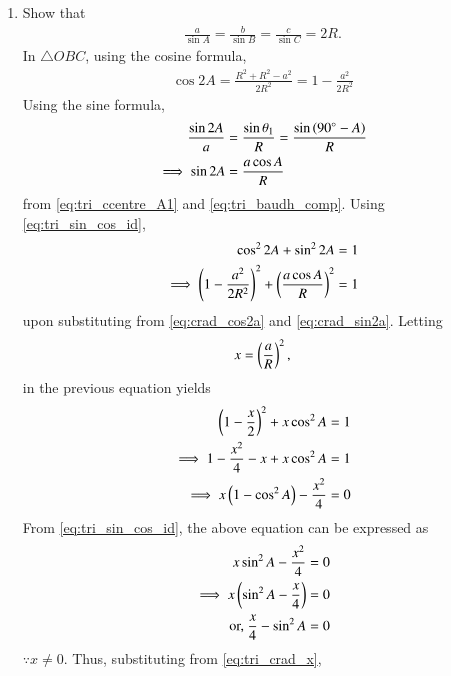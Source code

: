 \renewcommand{\theequation}{\theenumi}
\begin{enumerate}[label=\arabic*.,ref=\thesubsection.\theenumi]

\item Show that 
\begin{align}
\label{eq:tri_crad_R}
\frac{a}{\sin A} = \frac{b}{\sin B} = \frac{c}{\sin C} = 2R.
\end{align}
%
\solution In $\triangle OBC$, using the cosine formula, 
\begin{align}
\cos 2A = \frac{R^2+R^2 - a^2}{2R^2} = 1 -\frac{a^2}{2R^2}
\label{eq:crad_cos2a}
\end{align}
%
Using the sine formula, 
\begin{align}
\frac{\sin 2A}{a} &= \frac{\sin \theta_1}{R} = \frac{\sin\left(90\degree- A\right)}{R}
\\
\implies \sin 2A &= \frac{a\cos A}{R}
\label{eq:crad_sin2a}
\end{align}
%
from \eqref{eq:tri_ccentre_A1} and \eqref{eq:tri_baudh_comp}.	Using \eqref{eq:tri_sin_cos_id}, 
\begin{align}
\cos^2 2A + \sin^2 2A&= 1
\\
\implies \left(1 -\frac{a^2}{2R^2}\right)^2 + \left(\frac{a\cos A}{R}\right)^2 &= 1
\end{align}
%
upon substituting from \eqref{eq:crad_cos2a}  and \eqref{eq:crad_sin2a}.  Letting
%
\begin{align}
\label{eq:tri_crad_x}
x = \left(\frac{a}{R}\right)^2,
\end{align}
%
in the previous equation yields
%
\begin{align}
 \left(1 -\frac{x}{2}\right)^2 + x\cos^2 A&= 1
\\
\implies 1 - \frac{x^2}{4} -x + x\cos^2 A&= 1
\\
\implies x\left(1-\cos^2 A\right) - \frac{x^2}{4} &= 0
\end{align}
%
From \eqref{eq:tri_sin_cos_id}, the above equation can be expressed as
%
\begin{align}
x\sin^2 A - \frac{x^2}{4} &= 0
\\
\implies x\left(\sin^2 A - \frac{x}{4}\right) &= 0
\\
\text{or, } \frac{x}{4} - \sin^2 A &=0
\end{align}
%
$\because x \ne 0$.  Thus, substituting from \eqref{eq:tri_crad_x},

\end{enumerate}
